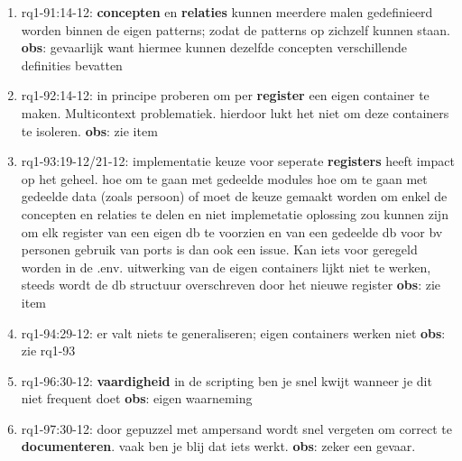 \begin{enumerate}
    \item rq1-91:14-12: \textbf{concepten} en \textbf{relaties} kunnen meerdere malen gedefinieerd worden binnen de eigen patterns; zodat de patterns op zichzelf kunnen staan.
    \newline\textbf{obs}: gevaarlijk want hiermee kunnen dezelfde concepten verschillende definities bevatten
    
    \item rq1-92:14-12: in principe proberen om per \textbf{register} een eigen container te maken. Multicontext problematiek. 
    hierdoor lukt het niet om deze containers te isoleren. 
    \newline\textbf{obs}: zie item
    
    \item rq1-93:19-12/21-12: implementatie keuze voor seperate \textbf{registers} heeft impact op het geheel.
    hoe om te gaan met gedeelde modules
    hoe om te gaan met gedeelde data (zoals persoon)
    of moet de keuze gemaakt worden om enkel de concepten en relaties te delen en niet implemetatie
    oplossing zou kunnen zijn om elk register van een eigen db te voorzien en van een gedeelde db voor bv personen
    gebruik van ports is dan ook een issue. Kan iets voor geregeld worden in de .env.
    uitwerking van de eigen containers lijkt niet te werken, steeds wordt de db structuur overschreven door het nieuwe register
    \newline\textbf{obs}: zie item
    
    \item rq1-94:29-12: er valt niets te generaliseren; eigen containers werken niet
    \newline\textbf{obs}:  zie rq1-93
    
    \item rq1-96:30-12: \textbf{vaardigheid} in de scripting ben je snel kwijt wanneer je dit niet frequent doet
    \newline\textbf{obs}: eigen waarneming
    
    \item rq1-97:30-12: door gepuzzel met ampersand wordt snel vergeten om correct te \textbf{documenteren}. vaak ben je blij dat iets werkt.
    \newline\textbf{obs}: zeker een gevaar.
    
\end{enumerate}
    
    \newpage







